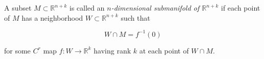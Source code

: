 A subset $M \subset \mathbb{R}^{n+k}$ is called an \textit{$n$-dimensional submanifold of $\mathbb{R}^{n+k}$} if each point of $M$ has a neighborhood $W \subset \mathbb{R}^{n+k}$ such that

$$W \cap M = f^{-1}(0)$$

for some $C^r$ map $f: W \to \mathbb{R}^k$ having rank $k$ at each point of $W \cap M$.
